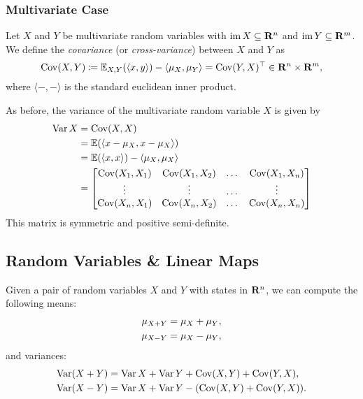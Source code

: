 \subsubsection{Multivariate Case}

\begin{definition}
\label{def:covariance-multivariate}
Let \(X\) and \(Y\) be multivariate random variables with \(\operatorname{im} X \subseteq
\mathbf{R}^n\) and \(\operatorname{im} Y \subseteq \mathbf{R}^m\). We define the \emph{covariance} (or \emph{cross-variance}) between
\(X\) and \(Y\) as
\[
\operatorname{Cov}(X, Y) \coloneq \operatorname{\mathbb{E}}_{X, Y}(\langle x, y \rangle) -
\langle \mu_X , \mu_Y  \rangle
= \operatorname{Cov}(Y, X)^{\operatorname{\top}} \in \mathbf{R}^n \times \mathbf{R}^m,
\]
where \(\langle -, - \rangle\) is the standard euclidean inner product.

As before, the variance of the multivariate random variable \(X\) is given by
\begin{align*}
  \operatorname{Var} X
  &= \operatorname{Cov}(X, X) \\
  &= \operatorname{\mathbb{E}}(\langle x - \mu_X, x - \mu_X \rangle) \\
  &= \operatorname{\mathbb{E}}(\langle x, x \rangle) - \langle \mu_X, \mu_X \rangle \\
  &=
    \begin{bmatrix}
      \operatorname{Cov}(X_1, X_1) &\operatorname{Cov}(X_1, X_2) &\dots &\operatorname{Cov}(X_1, X_n) \\
      \vdots &\vdots &\dots &\vdots \\
      \operatorname{Cov}(X_n, X_1) &\operatorname{Cov}(X_n, X_2) &\dots &\operatorname{Cov}(X_n, X_n) \\
    \end{bmatrix}
\end{align*}
This matrix is symmetric and positive semi-definite.
\end{definition}


\subsection{Random Variables \& Linear Maps}

\begin{lemma}
\label{lem:sums-differences-random-variables}
Given a pair of random variables \(X\) and \(Y\) with states in \(\mathbf{R}^n\), we can
compute the following means:
\begin{align*}
  \mu_{X + Y} &= \mu_X + \mu_Y, \\
  \mu_{X - Y} &= \mu_X - \mu_Y,
\end{align*}
and variances:
\begin{align*}
  \operatorname{Var}(X + Y) &= \operatorname{Var} X + \operatorname{Var} Y + \operatorname{Cov}(X, Y) + \operatorname{Cov}(Y, X), \\
  \operatorname{Var}(X - Y) &= \operatorname{Var} X + \operatorname{Var} Y - (\operatorname{Cov}(X, Y) + \operatorname{Cov}(Y, X)). \\
\end{align*}
\end{lemma}

